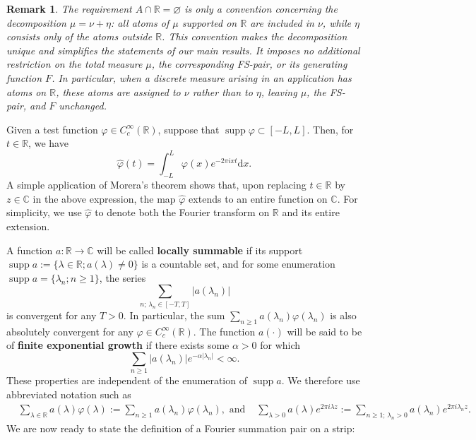 \documentclass[a4paper,reqno,12pt]{amsart}
\DeclareMathOperator{\supp}{\mathrm{supp}}
\newtheorem{remark}{Remark}
\renewcommand{\r}{\mathbb{R}}
\newcommand{\cp}{\mathbb{C}} %
\newcommand{\ft}{\widehat}
\newcommand{\la}{\lambda}
\newcommand{\al}{\alpha}
\newcommand{\p}{\varphi}
\renewcommand{\d}{\mathrm{d}}
\newcommand{\cd}{\cdot}
\newcommand{\1}{{\bf 1}}
\newcommand{\ra}{\rightarrow}
\begin{document}
\begin{remark}
\label{remark_measure_decomposition}
The requirement $A\cap\r=\varnothing$ is only a convention concerning the decomposition $\mu=\nu+\eta$: all atoms of $\mu$ supported on $\r$ are included in $\nu$, while $\eta$ consists only of the atoms outside $\r$. This convention makes the decomposition unique and simplifies the statements of our main results. It imposes no additional restriction on the total measure $\mu$, the corresponding FS-pair, or its generating function $F$. In particular, when a discrete measure arising in an application has atoms on $\r$, these atoms are assigned to $\nu$ rather than to $\eta$, leaving $\mu$, the FS-pair, and $F$ unchanged.
\end{remark}

Given a test function $\p\in C^\infty_c(\r)$, suppose that $\supp{\p}\subset [-L,L]$. Then, for $t\in\r$, we have 
\begin{equation}
\label{eq:phi_entire_extension}
    \ft{\p}(t)=\int_{-L}^{L} \p(x)e^{-2\pi ixt}\d x.
\end{equation}
A simple application of Morera's theorem shows that, upon replacing $t\in\r$ by $z\in\cp$ in the above expression, the map $\ft{\p}$ extends to an entire function on $\cp$. For simplicity, we use $\ft{\p}$ to denote both the Fourier transform on $\r$ and its entire extension.

A function $a:\r\ra\cp$ will be called \textbf{locally summable} if its support $\supp{a}:=\{\la\in\r;a(\la)\neq0\}$ is a countable set, and for some enumeration $\supp{a}=\{\la_n;n\geq1\}$, the series 
\begin{equation}
    \sum_{n;\, \la_n\in[-T,T]} |a(\la_n)|
\end{equation}
is convergent for any $T>0$. In particular, the sum $\sum_{n\geq1} a(\la_n)\p(\la_n)$ is also absolutely convergent for any $\p\in C^\infty_c(\r)$. The function $a(\cd)$ will be said to be of \textbf{finite exponential growth} if there exists some $\al>0$ for which
\begin{equation}
    \sum_{n\geq1} |a(\la_n)|e^{-\al|\la_n|}<\infty.
\end{equation}
These properties are independent of the enumeration of $\supp{a}$. We therefore use abbreviated notation such as
\begin{align}
    &\sum_{\la\in\r} a(\la)\p(\la):=\sum_{n\geq1} a(\la_n)\p(\la_n),\text{ and } &\sum_{\la>0} a(\la)e^{2\pi i\la z}:=\sum_{n\geq1;\, \la_n>0} a(\la_n)e^{2\pi i\la_n z}.
\end{align}
We are now ready to state the definition of a Fourier summation pair on a strip:
\end{document}
